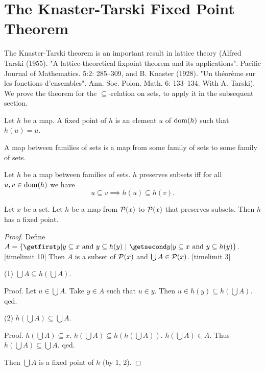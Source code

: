 \documentclass{article}
\begin{document}
\section{The Knaster-Tarski Fixed Point Theorem}

The Knaster-Tarski theorem is an important result in lattice theory
(Alfred Tarski (1955). "A lattice-theoretical fixpoint theorem and its applications". 
Pacific Journal of Mathematics. 5:2: 285–309, and
B. Knaster (1928). "Un théorème sur les fonctions d'ensembles". 
Ann. Soc. Polon. Math. 6: 133–134. With A. Tarski). We prove the theorem for 
the $\subseteq$-relation on sets, to apply it
in the subsequent section.

 \begin{forthel}
    \begin{definition}
      Let $h$ be a map.
      A fixed point of $h$ is an element $u$ of $\operatorname{dom}(h)$ such that $h(u) = u$.
    \end{definition}

    \begin{definition}
      A map between families of sets is a map from some family of 
sets to some
      family of sets.
    \end{definition}

    \begin{definition*}
Let $h$ be a map between families of sets.
      $h$ preserves subsets iff for all $u, v \in \operatorname{dom}(h)$
      we have \[ u \subseteq v \implies h(u) \subseteq h(v). \]
    \end{definition*}


    \begin{theorem*}\label{KT}
      Let $x$ be a set.
      Let $h$ be a map from ${\cal P}(x)$ to ${\cal P}(x)$ that preserves subsets.
      Then $h$ has a fixed point.
    \end{theorem*}
    \begin{proof}
      Define $A = \class{y | \text{$y \subseteq x$ and
      $y \subseteq h(y)$}}$.
[timelimit 10]
      Then $A$ is a subset of ${\cal P}(x)$ and
      $\bigcup A \in {\cal P}(x)$.
[timelimit 3] 

(1) $\bigcup A \subseteq h(\bigcup A)$.

Proof.        Let $u \in \bigcup A$.
        Take $y \in A$ such that $u \in y$.
        Then $u \in h(y) \subseteq h(\bigcup A)$.
      qed.

(2) $h(\bigcup A) \subseteq \bigcup A$.

Proof.      $h(\bigcup A) \subseteq x$.
$h(\bigcup A) \subseteq h(h(\bigcup A))$.
$h(\bigcup A) \in A$.
Thus $h(\bigcup A) \subseteq \bigcup A$.
qed.

Then $\bigcup A$ is a fixed point of $h$ (by 1, 2).
    \end{proof}

\end{forthel}
\end{document}
